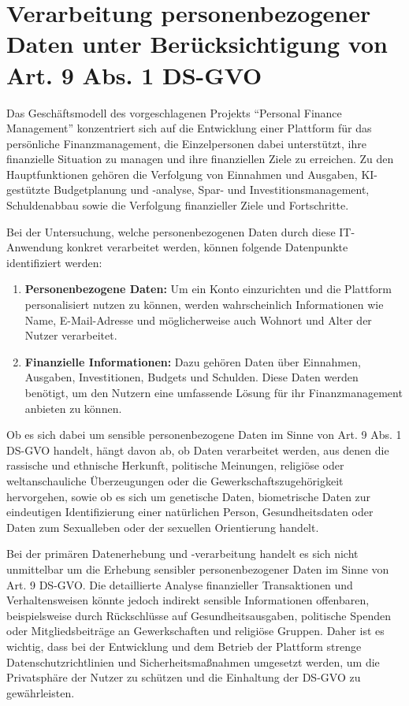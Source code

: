 \chapter{Verarbeitung personenbezogener Daten unter Berücksichtigung von Art. 9 Abs. 1 DS-GVO}

Das Geschäftsmodell des vorgeschlagenen Projekts \enquote{Personal Finance Management} konzentriert sich auf die Entwicklung einer Plattform für das persönliche Finanzmanagement, die Einzelpersonen dabei unterstützt, ihre finanzielle Situation zu managen und ihre finanziellen Ziele zu erreichen. Zu den Hauptfunktionen gehören die Verfolgung von Einnahmen und Ausgaben, KI-gestützte Budgetplanung und -analyse, Spar- und Investitionsmanagement, Schuldenabbau sowie die Verfolgung finanzieller Ziele und Fortschritte.

Bei der Untersuchung, welche personenbezogenen Daten durch diese IT-Anwendung konkret verarbeitet werden, können folgende Datenpunkte identifiziert werden:

\begin{enumerate}
    \item \textbf{Personenbezogene Daten:} Um ein Konto einzurichten und die Plattform personalisiert nutzen zu können, werden wahrscheinlich Informationen wie Name, E-Mail-Adresse und möglicherweise auch Wohnort und Alter der Nutzer verarbeitet.
    \item \textbf{Finanzielle Informationen:} Dazu gehören Daten über Einnahmen, Ausgaben, Investitionen, Budgets und Schulden. Diese Daten werden benötigt, um den Nutzern eine umfassende Lösung für ihr Finanzmanagement anbieten zu können.
\end{enumerate}

Ob es sich dabei um sensible personenbezogene Daten im Sinne von Art. 9 Abs. 1 DS-GVO handelt, hängt davon ab, ob Daten verarbeitet werden, aus denen die rassische und ethnische Herkunft, politische Meinungen, religiöse oder weltanschauliche Überzeugungen oder die Gewerkschaftszugehörigkeit hervorgehen, sowie ob es sich um genetische Daten, biometrische Daten zur eindeutigen Identifizierung einer natürlichen Person, Gesundheitsdaten oder Daten zum Sexualleben oder der sexuellen Orientierung handelt.

Bei der primären Datenerhebung und -verarbeitung handelt es sich nicht unmittelbar um die Erhebung sensibler personenbezogener Daten im Sinne von Art. 9 DS-GVO. Die detaillierte Analyse finanzieller Transaktionen und Verhaltensweisen könnte jedoch indirekt sensible Informationen offenbaren, beispielsweise durch Rückschlüsse auf Gesundheitsausgaben, politische Spenden oder Mitgliedsbeiträge an Gewerkschaften und religiöse Gruppen. Daher ist es wichtig, dass bei der Entwicklung und dem Betrieb der Plattform strenge Datenschutzrichtlinien und Sicherheitsmaßnahmen umgesetzt werden, um die Privatsphäre der Nutzer zu schützen und die Einhaltung der DS-GVO zu gewährleisten.